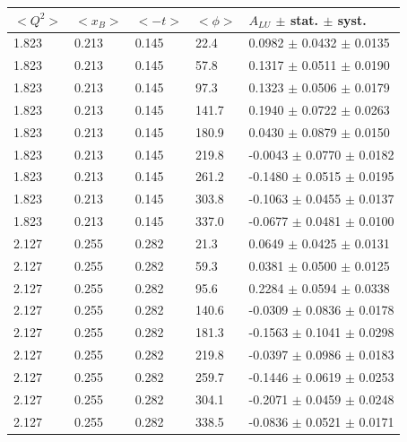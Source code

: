 \begin{table}[!h]
   \begin{center}
      \begin{tabular}{||l|l|l|l|l||}
         \hline
 $<Q^{2}>$ & $<x_{B}>$ & $<-t>$ & $<\phi>$ & $A_{LU}$ $\pm$ stat. $\pm$ syst.\\
  \hline

   1.823 & 0.213 & 0.145 & 22.4  &  0.0982   $\pm$   0.0432   $\pm$  0.0135  \\
   1.823 & 0.213 & 0.145 & 57.8  &  0.1317   $\pm$   0.0511   $\pm$  0.0190  \\
   1.823 & 0.213 & 0.145 & 97.3  &  0.1323   $\pm$   0.0506   $\pm$  0.0179  \\
   1.823 & 0.213 & 0.145 & 141.7 &  0.1940   $\pm$   0.0722   $\pm$  0.0263  \\
   1.823 & 0.213 & 0.145 & 180.9 &  0.0430   $\pm$   0.0879   $\pm$  0.0150  \\
   1.823 & 0.213 & 0.145 & 219.8 & -0.0043   $\pm$   0.0770   $\pm$  0.0182  \\
   1.823 & 0.213 & 0.145 & 261.2 & -0.1480   $\pm$   0.0515   $\pm$  0.0195  \\
   1.823 & 0.213 & 0.145 & 303.8 & -0.1063   $\pm$   0.0455   $\pm$  0.0137  \\
   1.823 & 0.213 & 0.145 & 337.0 & -0.0677   $\pm$   0.0481   $\pm$  0.0100  \\
 \hline                                                                       
  2.127 & 0.255 & 0.282  & 21.3  &  0.0649   $\pm$   0.0425   $\pm$  0.0131  \\
  2.127 & 0.255 & 0.282  & 59.3  &  0.0381   $\pm$   0.0500   $\pm$  0.0125  \\
  2.127 & 0.255 & 0.282  & 95.6  &  0.2284   $\pm$   0.0594   $\pm$  0.0338  \\
  2.127 & 0.255 & 0.282  & 140.6 & -0.0309   $\pm$   0.0836   $\pm$  0.0178  \\
  2.127 & 0.255 & 0.282  & 181.3 & -0.1563   $\pm$   0.1041   $\pm$  0.0298  \\
  2.127 & 0.255 & 0.282  & 219.8 & -0.0397   $\pm$   0.0986   $\pm$  0.0183  \\
  2.127 & 0.255 & 0.282  & 259.7 & -0.1446   $\pm$   0.0619   $\pm$  0.0253  \\
  2.127 & 0.255 & 0.282  & 304.1 & -0.2071   $\pm$   0.0459   $\pm$  0.0248  \\
  2.127 & 0.255 & 0.282  & 338.5 & -0.0836   $\pm$   0.0521   $\pm$  0.0171  \\

\end{tabular}
\end{center}
\end{table}
